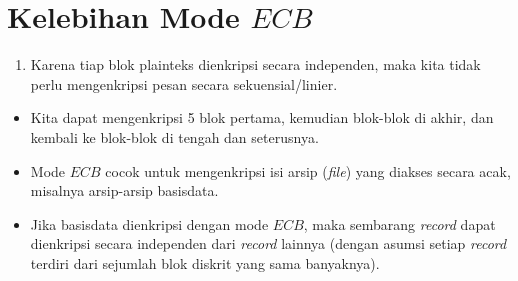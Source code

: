 \documentclass{article}
\begin{document}

\section*{Kelebihan Mode $ECB$}

\begin{enumerate}
    \item Karena tiap blok plainteks dienkripsi secara independen, maka kita tidak perlu mengenkripsi pesan secara sekuensial/linier.
\end{enumerate}

\begin{itemize}
    \item Kita dapat mengenkripsi 5 blok pertama, kemudian blok-blok di akhir, dan kembali ke blok-blok di tengah dan seterusnya.
    \item Mode $ECB$ cocok untuk mengenkripsi isi arsip (\textit{file}) yang diakses secara acak, misalnya arsip-arsip basisdata.
    \item Jika basisdata dienkripsi dengan mode $ECB$, maka sembarang \textit{record} dapat dienkripsi secara independen dari \textit{record} lainnya (dengan asumsi setiap \textit{record} terdiri dari sejumlah blok diskrit yang sama banyaknya).
\end{itemize}
\end{document}
